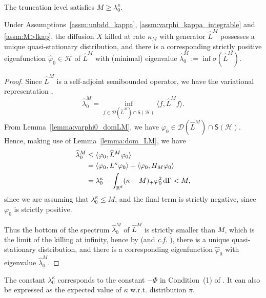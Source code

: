 \documentclass{aptpub}
\newcommand{\Rd}{\mathbb R^d}
\newcommand{\Lk}{L^\kappa}
\newcommand{\lkap}{\lambda_0^\kappa}
\newcommand{\Dom}{\mathcal D}
\renewcommand{\H}{\mathcal H}
\begin{document}
\begin{assumption}
    The truncation level satisfies $M \ge  \lkap$.
    \label{assm:M>lkap}
\end{assumption}
\begin{theorem}
    Under Assumptions~\ref{assm:unbdd_kappa}, \ref{assm:varphi_kappa_integrable} and \ref{assm:M>lkap}, the 
    diffusion $X$ killed at rate $\kappa_M$ 
    with generator $\widehat{L}^M$ possesses a unique quasi-stationary distribution, and there is a corresponding strictly positive eigenfunction $\widehat \varphi_0 \in \H$ of $\widehat{L}^M$ with (minimal) eigenvalue $\widehat{\lambda}_0^M := \inf \sigma(\widehat{L}^M)$.
    \label{thm:tildvarphi0}
\end{theorem}
\begin{proof}
    Since $\widehat{L}^M$ is a self-adjoint semibounded operator, we have the variational representation \cite[Theorem XIII.1]{Reed1978},
    \begin{equation*}
        \widehat{\lambda}_0^M = \inf_{f \in \Dom(\widehat{L}^M)\cap \mathsf S(\H)} \langle f, \widehat{L}^M f\rangle.
    \end{equation*}
    From Lemma~\ref{lemma:varphi0_domLM}, we have $\varphi_0 \in \Dom(\widehat{L}^M)\cap \mathsf S(\H)$. Hence, making use of Lemma~\ref{lemma:dom_LM}, we have
    \begin{equation*}
        \begin{split}
            \widehat{\lambda}_0^M &\le \langle \varphi_0, \widehat{L}^M \varphi_0\rangle \\
            &= \langle \varphi_0, \Lk \varphi_0\rangle+\langle \varphi_0, H_M \varphi_0\rangle\\
            &= \lkap -\int_{\Rd} (\kappa-M)_+ \varphi_0^2\dif \Gamma < M,
        \end{split}
    \end{equation*}
    since we are assuming that $\lkap \le M$, and the final term is strictly negative, since $\varphi_0$ is strictly positive.
    
    Thus the bottom of the spectrum $\widehat{\lambda}_0^M$ of $\widehat{L}^M$ is strictly smaller than $M$, which is the limit of the killing at infinity, hence by \cite[Theorem 4.5]{Champagnat2017} (and \textit{c.f.} \cite[Theorem 4.3]{Kolb2012}), there is a unique quasi-stationary distribution, and there is a corresponding eigenfunction $\widehat \varphi_0$ with eigenvalue $\widehat{\lambda}_0^M$.
\end{proof}
\begin{remark}
    The constant $\lkap$ corresponds to the constant $-\Phi$ in Condition~(1) of \cite{Pollock2020}. It can also be expressed as the expected value of $\kappa$ w.r.t. distribution $\pi$.
\end{remark}
\end{document}
